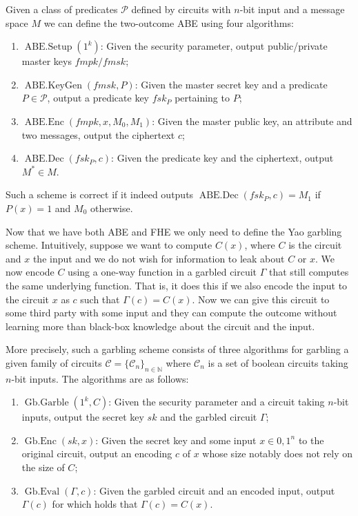 \documentclass[11pt, a4paper]{article}
\newcommand{\op}[1]{\operatorname{#1}}
\begin{document}
Given a class of predicates $\mathcal{P}$ defined by circuits with $n$-bit input and a message space $M$ we can define the two-outcome ABE using four algorithms:
\begin{enumerate}
    \item $\op{ABE.Setup}(1^k)$: Given the security parameter, output public/private master keys $fmpk/fmsk$;
    \item $\op{ABE.KeyGen}(fmsk, P)$: Given the master secret key and a predicate $P \in \mathcal{P}$, output a predicate key $fsk_P$ pertaining to $P$;
    \item $\op{ABE.Enc}(fmpk, x, M_0, M_1)$: Given the master public key, an attribute and two messages, output the ciphertext $c$;
    \item $\op{ABE.Dec}(fsk_P, c)$: Given the predicate key and the ciphertext, output $M^* \in M$.
\end{enumerate}
Such a scheme is correct if it indeed outputs $\op{ABE.Dec}(fsk_P, c) = M_1$ if $P(x) = 1$ and $M_0$ otherwise.

Now that we have both ABE and FHE we only need to define the Yao garbling scheme.
Intuitively, suppose we want to compute $C(x)$, where $C$ is the circuit and $x$ the input and we do not wish for information to leak about $C$ or $x$.
We now encode $C$ using a one-way function in a garbled circuit $\Gamma$ that still computes the same underlying function.
That is, it does this if we also encode the input to the circuit $x$ as $c$ such that $\Gamma(c) = C(x)$.
Now we can give this circuit to some third party with some input and they can compute the outcome without learning more than black-box knowledge about the circuit and the input.

More precisely, such a garbling scheme consists of three algorithms for garbling a given family of circuits $\mathcal{C} = \{\mathcal{C}_n\}_{n\in\mathbb{N}}$ where $\mathcal{C}_n$ is a set of boolean circuits taking $n$-bit inputs. The algorithms are as follows:
\begin{enumerate}
    \item $\op{Gb.Garble}(1^k, C)$: Given the security parameter and a circuit taking $n$-bit inputs, output the secret key $sk$ and the garbled circuit $\Gamma$;
    \item $\op{Gb.Enc}(sk, x)$: Given the secret key and some input $x \in {0,1}^n$ to the original circuit, output an encoding $c$ of $x$ whose size notably does not rely on the size of $C$;
    \item $\op{Gb.Eval}(\Gamma, c)$: Given the garbled circuit and an encoded input, output $\Gamma(c)$ for which holds that $\Gamma(c) = C(x)$.
\end{enumerate}
\end{document}
